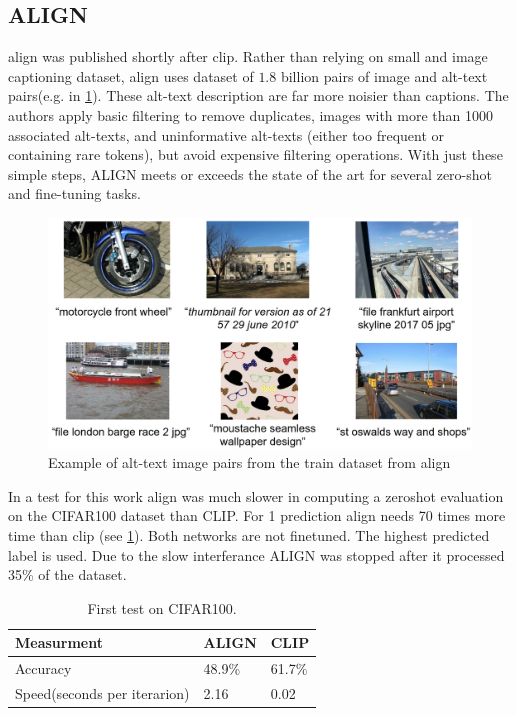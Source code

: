        \subsection{ALIGN
            \label{section:align}}
        \acrfull{align}\cite{ALIGN} was published shortly after \acrshort{clip}.
        Rather than relying on small and image captioning dataset, \acrshort{align} uses dataset of \(1.8\) billion pairs of image and alt-text pairs(e.g. in \cref{fig:crossmodalnetworks:alignepairs}).
        These alt-text description are far more noisier than captions.
        The authors apply basic filtering to remove duplicates, images with more than 1000 associated alt-texts, and uninformative alt-texts (either too frequent or containing rare tokens), but avoid expensive filtering operations.
        With just these simple steps, ALIGN meets or exceeds the state of the art for several zero-shot and fine-tuning tasks.
        \begin{figure}
            \centering
            \includegraphics[width=\textwidth]{Images/crossmodalnetworks/examplepicsalign.png}
            \caption{Example of alt-text image pairs from the train dataset from \acrshort{align}}
            \label{fig:crossmodalnetworks:alignepairs}
        \end{figure}

        In a test for this work \acrshort{align} was much slower in computing a zeroshot evaluation on the CIFAR100\cite{cifar100} dataset than CLIP.
        For 1 prediction \acrshort{align} needs 70 times more time than \acrshort{clip} (see \cref{tab:clipaligntest}).
        Both networks are not finetuned. The highest predicted label is used. Due to the slow interferance ALIGN was stopped after it processed 35\% of the dataset.

        \begin{table}
            \centering
            \begin{tabular}{lll}
                \hline
            \textbf{Measurment}&\textbf{ALIGN}&\textbf{CLIP}\\\hline
            Accuracy& 48.9\% & 61.7\%\\
            Speed(seconds per iterarion)&  2.16&  0.02\\ \hline
            \end{tabular}
            \caption{First test on CIFAR100.}
            \label{tab:clipaligntest}
        \end{table}

